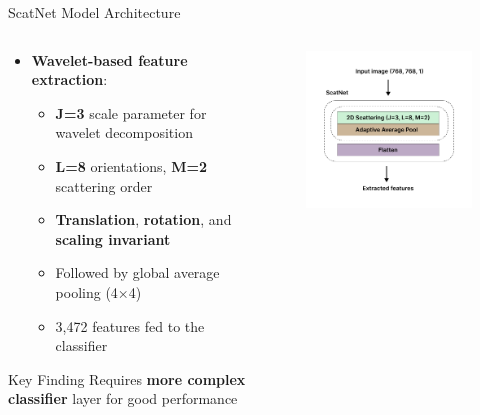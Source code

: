\documentclass[aspectratio=169,8pt]{beamer}  %
\begin{document}
\begin{frame}{ScatNet Model Architecture}
\begin{columns}[T]
\begin{column}{0.6\textwidth}
\begin{itemize}
\item \textbf{Wavelet-based feature extraction}:
  \begin{itemize}
  \item \textbf{J=3} scale parameter for wavelet decomposition
  \item \textbf{L=8} orientations, \textbf{M=2} scattering order
  \item \textbf{Translation}, \textbf{rotation}, and \textbf{scaling invariant}
  \item Followed by global average pooling (4×4)
  \item 3,472 features fed to the classifier
  \end{itemize}
\end{itemize}

\begin{alertblock}{Key Finding}
Requires \textbf{more complex classifier} layer for good performance
\end{alertblock}
\end{column}
\begin{column}{0.4\textwidth}
\begin{figure}
\includegraphics[width=\textwidth]{imgs/scatnet_arch.png}
\end{figure}
\end{column}
\end{columns}
\end{frame}
\end{document}
